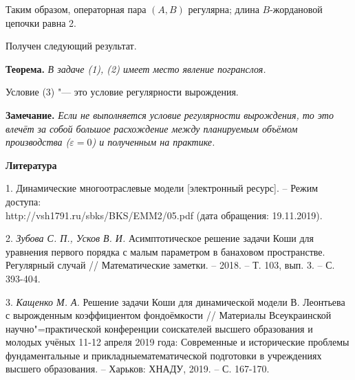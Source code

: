 Таким образом, операторная пара $(A,B)$ регулярна; длина $B$-жордановой цепочки равна 2.

Получен следующий результат.

\textbf{Теорема.} \textit{В задаче {\rm (1)}, {\rm (2)} имеет место явление погранслоя.}

Условие (3) "--- это условие регулярности вырождения.

\textbf{Замечание.} \textit{Если не выполняется условие регулярности вырождения, то это влечёт за собой большое расхождение между планируемым объёмом производства ($\varepsilon =0$) и полученным на практике.}


\smallskip \centerline {\bf Литература} \nopagebreak


1. Динамические многоотраслевые модели [электронный ресурс]. -- Режим доступа: \\ http://vsh1791.ru/sbks/BKS/EMM2/05.pdf (дата обращения: 19.11.2019).

2. {\it Зубова С. П., Усков В. И.} Асимптотическое решение задачи Коши для уравнения первого порядка с малым параметром в банаховом пространстве. Регулярный случай // Математические заметки. -- 2018. -- Т. 103, вып. 3. -- С. 393-404.

3. {\it Кащенко М. А.} Решение задачи Коши для динамической модели В. Леонтьева с вырожденным коэффициентом фондоёмкости // Материалы Всеукраинской научно"=практической конференции соискателей высшего образования и молодых учёных 11-12 апреля 2019 года: Современные и исторические проблемы фундаментальные и прикладныематематической подготовки в учреждениях высшего образования. -- Харьков: ХНАДУ, 2019. -- С. 167-170.
